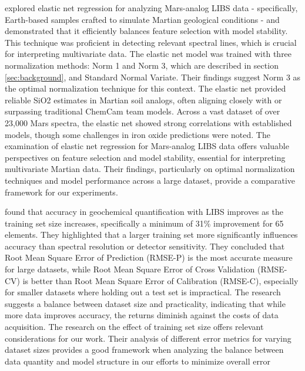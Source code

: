 \citeauthor{bai_application_2023} explored elastic net regression for analyzing Mars-analog LIBS data - specifically, Earth-based samples crafted to simulate Martian geological conditions - and demonstrated that it efficiently balances feature selection with model stability.
This technique was proficient in detecting relevant spectral lines, which is crucial for interpreting multivariate data.
The elastic net model was trained with three normalization methods: Norm 1 and Norm 3, which are described in section \ref{sec:background}, and Standard Normal Variate. Their findings suggest Norm 3 as the optimal normalization technique for this context.
The elastic net provided reliable SiO2 estimates in Martian soil analogs, often aligning closely with or surpassing traditional ChemCam team models.
Across a vast dataset of over 23,000 Mars spectra, the elastic net showed strong correlations with established models, though some challenges in iron oxide predictions were noted\cite{bai_application_2023}.
The examination of elastic net regression for Mars-analog LIBS data offers valuable perspectives on feature selection and model stability, essential for interpreting multivariate Martian data. Their findings, particularly on optimal normalization techniques and model performance across a large dataset, provide a comparative framework for our experiments.

\citeauthor{dyar_effect_2021} found that accuracy in geochemical quantification with LIBS improves as the training set size increases, specifically a minimum of 31\% improvement for 65 elements.
They highlighted that a larger training set more significantly influences accuracy than spectral resolution or detector sensitivity.
They concluded that Root Mean Square Error of Prediction (RMSE-P) is the most accurate measure for large datasets, while Root Mean Square Error of Cross Validation  (RMSE-CV) is better than Root Mean Square Error of Calibration (RMSE-C), especially for smaller datasets where holding out a test set is impractical.
The research suggests a balance between dataset size and practicality, indicating that while more data improves accuracy, the returns diminish against the costs of data acquisition\cite{dyar_effect_2021}.
The research on the effect of training set size offers relevant considerations for our work. Their analysis of different error metrics for varying dataset sizes provides a good framework when analyzing the balance between data quantity and model structure in our efforts to minimize overall error

